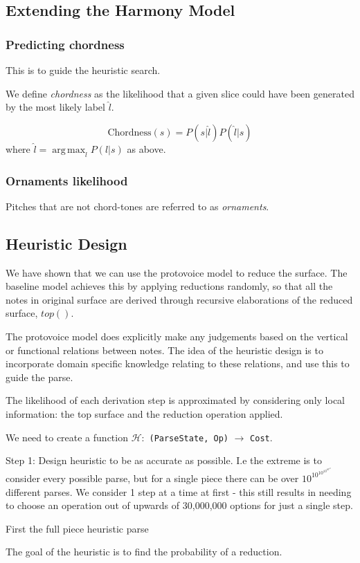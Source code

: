 \documentclass[12pt,a4paper,twoside,openright]{report}
\DeclareMathOperator*{\argmax}{arg\,max}
\theoremstyle{definition}
\begin{document}
\subsection{Extending the Harmony Model}

\subsubsection{Predicting chordness}
This is to guide the heuristic search.

We define \textit{chordness} as the likelihood that a given slice could have been generated by the most likely label $\hat{l}$.

\begin{equation}
  \text{Chordness}(s) = P(s | \hat{l}) P(\hat{l} | s) 
  \label{eq:chordness}
\end{equation}
where $\hat{l} = \argmax_l P(l | s)$ as above.

\subsubsection{Ornaments likelihood}
Pitches that are not chord-tones are referred to as \textit{ornaments}.


\subsection{Heuristic Design}
We have shown that we can use the protovoice model to reduce the surface.
The baseline model achieves this by applying reductions randomly, so that all the notes in original surface are derived through recursive elaborations of the reduced surface, $top()$.

The protovoice model does explicitly make any judgements based on the vertical or functional relations between notes. 
The idea of the heuristic design is to incorporate domain specific knowledge relating to these relations, and use this to guide the parse. 

The likelihood of each derivation step is approximated by considering only local information: the top surface and the reduction operation applied.

We need to create a function $\mathcal{H}:$ \texttt{(ParseState, Op)} $\to$ \texttt{Cost}. 



Step 1: Design heuristic to be as accurate as possible. I.e the extreme is to consider every possible parse, but for a single piece there can be over $10^{10^{10^{10^{10^{10}}}}}$ different parses. We consider 1 step at a time at first - this still results in needing to choose an operation out of upwards of 30,000,000 options for just a single step.     
\par
First the full piece heuristic parse 
\par
The goal of the heuristic is to find the probability of a reduction. 
\end{document}
